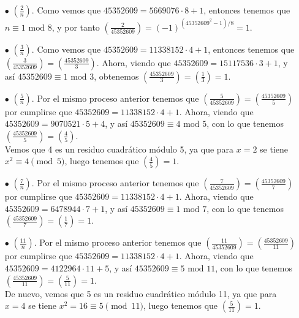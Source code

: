 \documentclass[fleqn]{article}
\begin{document}
    \begin{enumerate}
        \item[$\bullet$] $ \left(\frac{2}{n}\right) $. Como vemos que $45352609 = 5669076 \cdot 8 + 1$, entonces tenemos que
                    $ n \equiv 1 \text{ mod } 8 $, y por tanto $ \left(\frac{2}{45352609}\right) = (-1)^{(45352609^2 - 1)/8} = 1$.
        
        \item[$\bullet$] $ \left(\frac{3}{n}\right) $. Como vemos que $45352609 = 11338152 \cdot 4 + 1$, entonces tenemos que
                    $\left(\frac{3}{45352609}\right) = \left(\frac{45352609}{3}\right) $. Ahora, viendo que $45352609 = 15117536 \cdot 3 + 1$,
                    y así $ 45352609 \equiv 1 \text{ mod } 3$, obtenemos $\left(\frac{45352609}{3}\right) = \left(\frac{1}{3}\right) = 1$.
        
        \item[$\bullet$] $ \left(\frac{5}{n}\right) $. Por el mismo proceso anterior tenemos que $ \left(\frac{5}{45352609}\right) = \left(\frac{45352609}{5}\right)$
                    por cumplirse que $45352609 = 11338152 \cdot 4 + 1$. Ahora, viendo que $45352609 = 9070521 \cdot 5 + 4$, y así $ 45352609 \equiv 4 \text{ mod } 5$,
                    con lo que tenemos $\left(\frac{45352609}{5}\right) = \left(\frac{4}{5}\right)$. \\
                    Vemos que 4 es un residuo cuadrático módulo 5, ya que para $x = 2$ se tiene $x^2 \equiv 4 \pmod 5$, luego tenemos que $\left(\frac{4}{5}\right) = 1$.

        \item[$\bullet$] $ \left(\frac{7}{n}\right) $. Por el mismo proceso anterior tenemos que $ \left(\frac{7}{45352609}\right) = \left(\frac{45352609}{7}\right)$
                    por cumplirse que $45352609 = 11338152 \cdot 4 + 1$. Ahora, viendo que $45352609 = 6478944 \cdot 7 + 1$, y así $ 45352609 \equiv 1 \text{ mod } 7$,
                    con lo que tenemos $\left(\frac{45352609}{7}\right) = \left(\frac{1}{7}\right) = 1$. 

        \item[$\bullet$] $ \left(\frac{11}{n}\right) $. Por el mismo proceso anterior tenemos que $ \left(\frac{11}{45352609}\right) = \left(\frac{45352609}{11}\right)$
                    por cumplirse que $45352609 = 11338152 \cdot 4 + 1$. Ahora, viendo que $45352609 = 4122964 \cdot 11 + 5$, y así $ 45352609 \equiv 5 \text{ mod } 11$,
                    con lo que tenemos $\left(\frac{45352609}{11}\right) = \left(\frac{5}{11}\right) = 1$. \\ 
                    De nuevo, vemos que 5 es un residuo cuadrático módulo 11, ya que para $x = 4$ se tiene $x^2 = 16 \equiv 5 \pmod11$, luego tenemos que 
                    $\left(\frac{5}{11}\right) = 1$.
    \end{enumerate}
\end{document}
